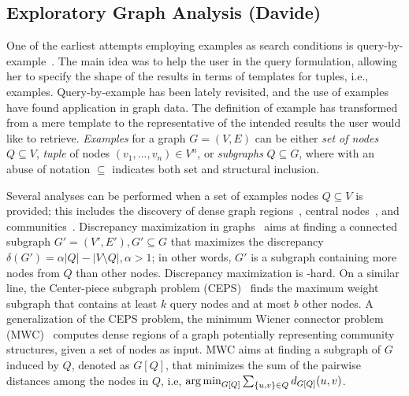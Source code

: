 \subsection{Exploratory Graph Analysis (Davide)} 


\noindent One of the earliest attempts employing examples as search conditions is query-by-example~\citep{zloof1975query}.
The main idea was to help the user in the query formulation, allowing her to specify the shape of the results in terms of templates for tuples, i.e., examples.
Query-by-example has been lately revisited, and the use of examples have found application in graph data. 
The definition of example has transformed from a mere template to the representative of the intended results the user would like to retrieve.
\emph{Examples} for a graph $G = (V,E)$ can be either \emph{set of nodes} $Q \subseteq V$, \emph{tuple} of nodes $(v_1, ..., v_n) \in V^n$, or \emph{subgraphs} $Q \subseteq G$, where with an abuse of notation $\subseteq$ indicates both set and structural inclusion. 

 Several analyses can be performed when a set of examples nodes $Q\subseteq V$ is provided; this includes the discovery of dense graph regions~\citep{gionis2015bump,ruchansky2015minimum}, central nodes~\citep{tong2006center}, and communities~\citep{staudt2014detecting,perozzi2014focused}.%
Discrepancy maximization in graphs~\citep{gionis2015bump} aims at finding a connected subgraph $G' = (V', E'), G' \subseteq G$ that maximizes the discrepancy $\delta(G'){=}\alpha|Q|{-}|V{\setminus}Q|, \alpha > 1$; in other words, $G'$ is a subgraph containing more nodes from $Q$ than other nodes. 
Discrepancy maximization is \NP-hard. 
On a similar line, the Center-piece subgraph problem (CEPS)~\citep{tong2006center} finds the maximum weight subgraph that contains at least $k$ query nodes and at most $b$ other nodes. 
A generalization of the CEPS problem, the minimum Wiener connector problem (MWC)~\citep{ruchansky2015minimum} computes dense regions of a graph potentially representing community structures, given a set of nodes as input. MWC aims at finding a subgraph of $G$ induced by $Q$, denoted as $G[Q]$, that minimizes the sum of the pairwise distances among the nodes in $Q$, i.e, $\operatorname*{\arg\min}_{G[Q]}\sum_{\{u,v\}{\in}Q}{}d_{G[Q]}(u,v)$. 

